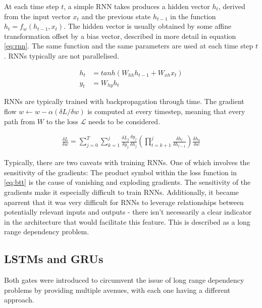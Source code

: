 \documentclass[12pt,twoside]{report}
\begin{document}
At each time step $t$, a simple RNN takes produces a hidden vector $h_t$, derived from the input vector $x_t$ and the previous state $h_{t-1}$ in the function $h_t = f_w(h_{t-1}, x_t)$. The hidden vector is usually obtained by some affine transformation offset by a bias vector, described in more detail in equation \ref{eq:rnn}. The same function and the same parameters are used at each time step $t$. RNNs typically are not parallelised. 

\begin{equation}
	\label{eq:rnn}
	\begin{aligned}
		h_t &= tanh(W_{hh}h_{t-1}+W_{xh}x_t)
	\\
	y_t &= W_{hy}h_t
	\end{aligned}
	\end{equation}

RNNs are typically trained with backpropagation through time. The gradient flow $w \leftarrow w - \alpha ({\delta L}/{\delta w})$ is computed at every timestep, meaning that every path from $W$ to the loss $\mathcal{L}$ needs to be considered.

\begin{equation}
	\label{eq:btt}
	\begin{aligned}
		\frac{\delta L}{\delta w} = \sum^T_{j=0}\sum^j_{k=1}\frac{\delta L_j}{\delta y_j}\frac{\delta y_j}{\delta h_j}(\prod^j_{t=k+1}\frac{\delta h_t}{\delta h_{t-1}})\frac{\delta h_k}{\delta w}
	\end{aligned}
	\end{equation}


Typically, there are two caveats with training RNNs. One of which involves the sensitivity of the gradients: The product symbol within the loss function in \ref{eq:btt} is the cause of vanishing and exploding gradients. The sensitivity of the gradients make it especially difficult to train RNNs. 
Additionally, it became aparrent that it was very difficult for RNNs to leverage relationships between potentially relevant inputs and outputs - there isn't necessarily a clear indicator in the architecture that would facilitate this feature. This is described as a long range dependency problem.

\subsection{LSTMs and GRUs} 

Both gates were introduced to circumvent the issue of long range dependency problems by providing multiple avenues, with each one having a different approach.
\end{document}
